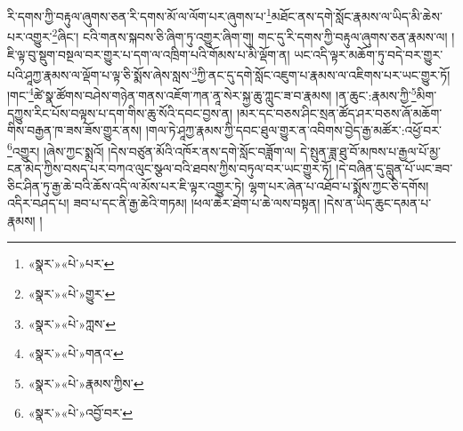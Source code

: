 རི་དགས་ཀྱི་བརྟུལ་ཞུགས་ཅན་རི་དགས་མོ་ལ་ལོག་པར་ཞུགས་པ་\footnote{«སྣར་»«པེ་»པར་}མཐོང་ནས་དགེ་སློང་རྣམས་ལ་ཡིད་མི་ཆེས་པར་འགྱུར་\footnote{«སྣར་»«པེ་»གྱུར་}ཞིང་། ངའི་གནས་སྐབས་ཅི་ཞིག་ཏུ་འགྱུར་ཞིག་གུ། གང་དུ་རི་དགས་ཀྱི་བརྟུལ་ཞུགས་ཅན་རྣམས་ལ། །ཇི་ལྟ་བུ་སྡུག་བསྔལ་བར་གྱུར་པ་དག་ལ་འཁྲིག་པའི་གོམས་པ་མི་ལྡོག་ན། ཡང་འདི་ལྟར་མཆོག་ཏུ་བདེ་བར་གྱུར་པའི་ཤཱཀྱ་རྣམས་ལ་ལྡོག་པ་ལྟ་ཅི་སྨོས་ཞེས་སླས་\footnote{«སྣར་»«པེ་»ཀླས་}ཀྱི་ནང་དུ་དགེ་སློང་འཇུག་པ་རྣམས་ལ་འཇིགས་པར་ཡང་གྱུར་ཏོ། །གང་\footnote{«སྣར་»«པེ་»གནའ་}ཚེ་སྣ་ཚོགས་བཤེས་གཉེན་གནས་འཇོག་ཀན་ནཱ་སེར་སྐྱ་ཆུ་ཀླུང་ཟ་བ་རྣམས། །ན་ཆུང་:རྣམས་ཀྱི་\footnote{«སྣར་»«པེ་»རྣམས་ཀྱིས་}མིག་དཀྱུས་རིང་པོས་བལྟས་པ་དག་གིས་ཆུ་སོའི་དབང་བྱས་ན། །མར་དང་བཅས་ཤིང་སྲན་ཚོད་ཤར་བཅས་ཞོ་མཆོག་གིས་བརྒྱན་ཁ་ཟས་ཟོས་གྱུར་ནས། །གལ་ཏེ་ཤཱཀྱ་རྣམས་ཀྱི་དབང་ཐུལ་གྱུར་ན་འབིགས་བྱེད་རྒྱ་མཚོར་:འཕྱོ་བར་\footnote{«སྣར་»«པེ་»འབྱོ་བར་}འགྱུར། །ཞེས་ཀྱང་སྨྲའོ། །དེས་བཙུན་མོའི་འཁོར་ནས་དགེ་སློང་བཟློག་ལ། དེ་སྤུན་ཟླ་ཐུ་བོ་མཁས་པ་རྒྱལ་པོ་མྱ་ངན་མེད་ཀྱིས་བསད་པར་བཀའ་ལུང་སྩལ་བའི་ཐབས་ཀྱིས་བཏུལ་བར་ཡང་གྱུར་ཏོ། །དེ་བཞིན་དུ་བླུན་པོ་ཡང་ཟབ་ཅིང་ཤིན་ཏུ་རྒྱ་ཆེ་བའི་ཆོས་འདི་ལ་མོས་པར་ཇི་ལྟར་འགྱུར་ཏེ། ལྷག་པར་ཞེན་པ་འཐོབ་པ་སྨོས་ཀྱང་ཅི་དགོས། འདིར་བཤད་པ། ཟབ་པ་དང་ནི་རྒྱ་ཆེའི་གཏམ། །ཕལ་ཆེར་ཐེག་པ་ཆེ་ལས་བསྟན། །དེས་ན་ཡིད་ཆུང་དམན་པ་རྣམས། །
